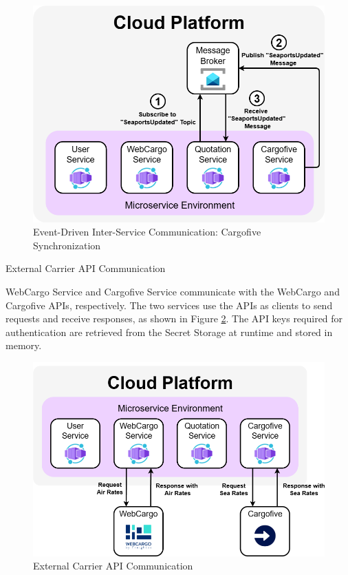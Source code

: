 \documentclass[12pt, reqno]{amsbook}
\makeatletter
\def\subsection{\@startsection{subsection}{2}%
      \z@{.5\linespacing\@plus.7\linespacing}{.25\linespacing}%
      {\normalfont\bfseries\flushleft}}
\theoremstyle{definition}
\theoremstyle{definition}
\numberwithin{section}{chapter}
\numberwithin{table}{chapter}
\numberwithin{figure}{chapter}
\makeatother
\begin{document}
\begin{figure}[H]
  \centering
  \includegraphics[width=0.9\linewidth]{images/EventDrivenCommunicationCargofive.png}
  \caption{\label{Figure:EventDrivenCommunicationCargofive}Event-Driven Inter-Service Communication: Cargofive Synchronization}
\end{figure}

\subsection{External Carrier API Communication}
\label{Subsection:External_Carrier_API_Communication}

WebCargo Service and Cargofive Service communicate with the WebCargo and Cargofive \acp{API}, respectively. The two services use the \acp{API} as clients to send requests and receive responses, as shown in Figure \ref{Figure:ExternalCarrierAPICommunication}. The \ac{API} keys required for authentication are retrieved from the Secret Storage at runtime and stored in memory.

\begin{figure}[H]
  \centering
  \includegraphics[width=0.9\linewidth]{images/ExternalCarrierAPICommunication.png}
  \caption{\label{Figure:ExternalCarrierAPICommunication}External Carrier \ac{API} Communication}
\end{figure}
\end{document}
